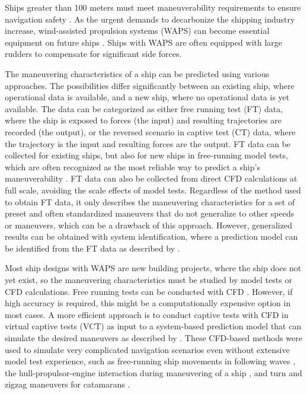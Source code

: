 Ships greater than 100 meters must meet maneuverability requirements to ensure navigation safety \citep{imoStandardsShipManoeuvrability2002}. As the urgent demands to decarbonize the shipping industry increase, wind-assisted propulsion systems (WAPS) can become essential equipment on future ships \citep{nelissenStudyAnalysisMarket2016}. Ships with WAPS are often equipped with large rudders to compensate for significant side forces.

The maneuvering characteristics of a ship can be predicted using various approaches. The possibilities differ significantly between an existing ship, where operational data is available, and a new ship, where no operational data is yet available. The data can be categorized as either free running test (FT) data, where the ship is exposed to forces (the input) and resulting trajectories are recorded (the output), or the reversed scenario in captive test (CT) data, where the trajectory is the input and resulting forces are the output. FT data can be collected for existing ships, but also for new ships in free-running model tests, which are often recognized as the most reliable way to predict a ship's maneuverability \citep{ittcITTCRecommendedProcedures2008}. FT data can also be collected from direct CFD calculations at full scale, avoiding the scale effects of model tests. Regardless of the method used to obtain FT data, it only describes the maneuvering characteristics for a set of preset and often standardized maneuvers \citep{imoStandardsShipManoeuvrability2002} that do not generalize to other speeds or maneuvers, which can be a drawback of this approach. However, generalized results can be obtained with system identification, where a prediction model can be identified from the FT data as described by \citet{luoParameterIdentificationShip2016, xuUncertaintyAnalysisHydrodynamic2019, wangOptimalDesignExcitation2020, alexanderssonSystemIdentificationVessel2022, haoRecurrentNeuralNetworks2022a, kimValidation4DOFManeuvering2024, alexanderssonSystemIdentificationPhysicsinformed2024b}.

Most ship designs with WAPS are new building projects, where the ship does not yet exist, so the maneuvering characteristics must be studied by model tests or CFD calculations. Free running tests can be conducted with CFD \citep{sakamotoURANSSimulationsStatic2012, elmoctarRANSBasedSimulatedShip2014, dumanTurnZigzagManoeuvres2022}. However, if high accuracy is required, this might be a computationally expensive option in most cases. A more efficient approach is to conduct captive tests with CFD in virtual captive tests (VCT) as input to a system-based prediction model that can simulate the desired maneuvers as described by \citet{simonsenKCSPMMTests2014, elmoctarRANSBasedSimulatedShip2014, hajivandVirtualSimulationManeuvering2015, yoonBenchmarkCFDValidation2015c, liuPredictionsShipManeuverability2018}. These CFD-based methods were used to simulate very complicated navigation scenarios even without extensive model test experience, such as free-running ship movements in following waves \citep{Araki2019}, the hull-propulsor-engine interaction during maneuvering of a ship \citep{elmoctarRANSBasedSimulatedShip2014}, and turn and zigzag maneuvers for catamarans \citep{dumanTurnZigzagManoeuvres2022}.

